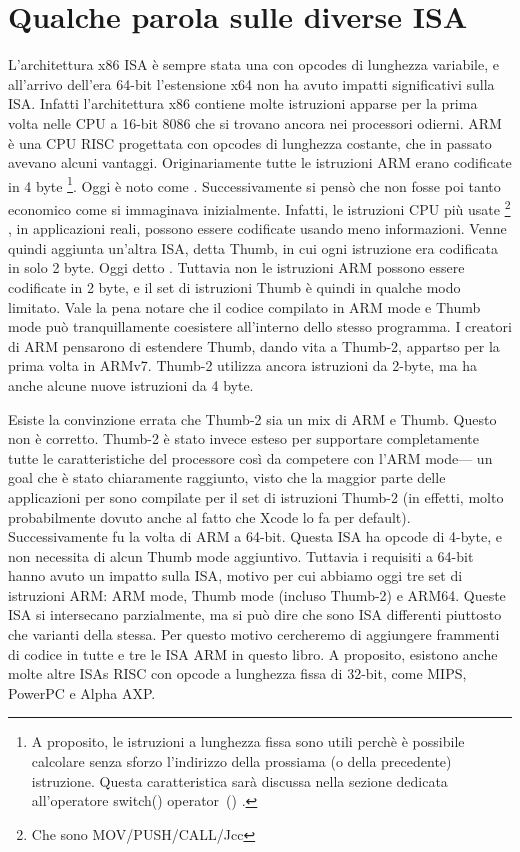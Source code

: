 %
%
%

\section{Qualche parola sulle diverse \ac{ISA}}
L'architettura x86 \ac{ISA} è sempre stata una con opcodes di lunghezza variabile, e all'arrivo dell'era 64-bit l'estensione x64 non ha avuto impatti significativi sulla \ac{ISA}. Infatti l'architettura x86 contiene molte istruzioni apparse per la prima volta nelle CPU a 16-bit 8086 che si trovano ancora nei processori odierni.
ARM è una \ac{CPU} \ac{RISC} progettata con opcodes di lunghezza costante, che in passato avevano alcuni vantaggi.
Originariamente tutte le istruzioni ARM erano codificate in 4 byte%
\footnote{
A proposito, le istruzioni a lunghezza fissa sono utili perchè è possibile calcolare senza sforzo l'indirizzo della prossiama (o della precedente) istruzione. Questa caratteristica sarà discussa nella sezione dedicata all'operatore switch() operator~() .
}.
Oggi è noto come .
Successivamente si pensò che non fosse poi tanto economico come si immaginava inizialmente.
Infatti, le istruzioni \ac{CPU} più usate \footnote{Che sono MOV/PUSH/CALL/Jcc} , in applicazioni reali, possono essere codificate usando meno informazioni.
Venne quindi aggiunta un'altra \ac{ISA}, detta Thumb, in cui ogni istruzione era codificata in solo 2 byte.
Oggi detto .
Tuttavia non  le istruzioni ARM possono essere codificate in 2 byte, e il set di istruzioni Thumb è quindi in qualche modo limitato.
Vale la pena notare che il codice compilato in ARM mode e Thumb mode può tranquillamente coesistere all'interno dello stesso programma.
I creatori di ARM pensarono di estendere Thumb, dando vita a Thumb-2, appartso per la prima volta in ARMv7.
Thumb-2 utilizza ancora istruzioni da 2-byte, ma ha anche alcune nuove istruzioni da 4 byte. 

Esiste la convinzione errata che Thumb-2 sia un mix di ARM e Thumb. Questo non è corretto. 
Thumb-2 è stato invece esteso per supportare completamente tutte le caratteristiche del processore così da competere con l'ARM mode--- un goal che è stato chiaramente raggiunto, visto che la maggior parte delle applicazioni per \idevices sono compilate per il set di istruzioni Thumb-2 (in effetti, molto probabilmente dovuto anche al fatto che Xcode lo fa per default).
Successivamente fu la volta di ARM a 64-bit. Questa \ac{ISA} ha opcode di 4-byte, e non necessita di alcun Thumb mode aggiuntivo.
Tuttavia i requisiti a 64-bit hanno avuto un impatto sulla \ac{ISA}, motivo per cui abbiamo oggi tre set di istruzioni ARM: ARM mode, Thumb mode (incluso Thumb-2) e ARM64.
Queste \ac{ISA} si intersecano parzialmente, ma si può dire che sono \ac{ISA} differenti piuttosto che varianti della stessa.
Per questo motivo cercheremo di aggiungere frammenti di codice in tutte e tre le \ac{ISA} ARM in questo libro.
%
%
%
A proposito, esistono anche molte altre \ac{ISA}s \ac{RISC} con opcode a lunghezza fissa di 32-bit, come MIPS, PowerPC e Alpha AXP.
